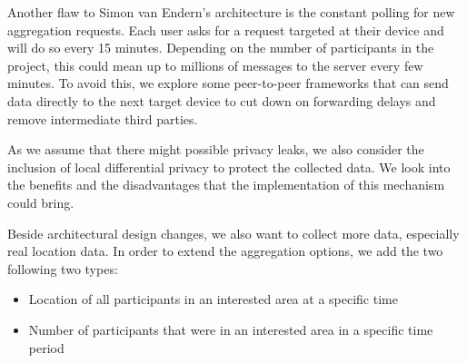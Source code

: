 Another flaw to Simon van Endern's architecture is the constant polling for new aggregation requests. Each user asks for a request targeted at their device and will do so every 15 minutes. Depending on the number of participants in the project, this could mean up to millions of messages to the server every few minutes. To avoid this, we explore some peer-to-peer frameworks that can send data directly to the next target device to cut down on forwarding delays and remove intermediate third parties.

As we assume that there might possible privacy leaks, we also consider the inclusion of local differential privacy to protect the collected data. We look into the benefits and the disadvantages that the implementation of this mechanism could bring.

Beside architectural design changes, we also want to collect more data, especially real location data. In order to extend the aggregation options, we add the two following two types:
\begin{itemize}
    \item Location of all participants in an interested area at a specific time
    \item Number of participants that were in an interested area in a specific time period
\end{itemize}


